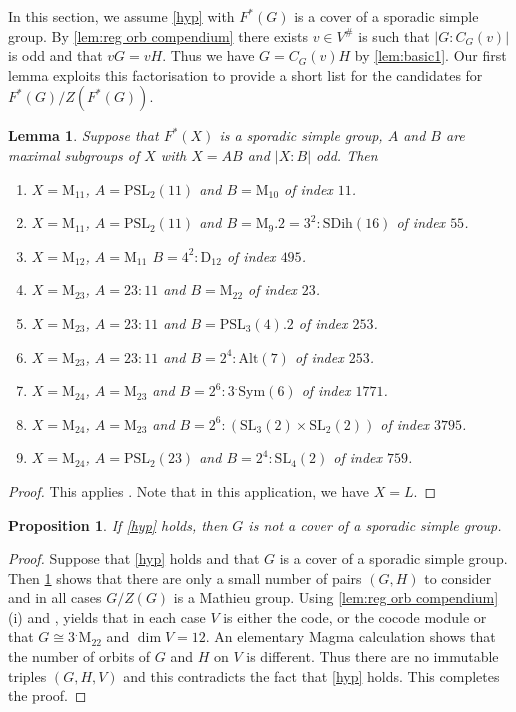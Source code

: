 \documentclass[12pt]{amsart}
\newtheorem{proposition}[theorem]{Proposition}
\newtheorem{lemma}[theorem]{Lemma}
\theoremstyle{remark}
\theoremstyle{notation}
\theoremstyle{definition}
\newcommand{\M}{\mathrm{M}}
\newcommand{\D}{\mathrm{D}}
\newcommand{\SL}{\mathrm{SL}}
\newcommand{\0}{\emptyset}
\newcommand{\PSL}{\mathrm{PSL}}
\newcommand{\Sym}{\mathrm{Sym}}
\newcommand{\Alt}{\mathrm{Alt}}
\newcommand{\SDih}{\mathrm{SDih}}
\begin{document}
In this section,  we assume  \cref{hyp}   with $F^*(G)$ is a cover of a sporadic simple group.  By \cref{lem:reg orb compendium} there exists  $v \in V^\#$ is such that $|G:C_G(v)|$ is odd and that $vG=vH$. Thus we have $G= C_G(v)H  $ by \cref{lem:basic1}. Our first lemma exploits this factorisation to provide a short list for the candidates for $F^*(G)/Z(F^*(G))$.


\begin{lemma}\label{lem:sporadic1} Suppose that $F^*(X)$ is  a sporadic simple group, $A$ and $B$ are maximal subgroups of $X$ with $X= AB$ and   $|X{:}B|$ odd. Then
\begin{enumerate}
\item $X=\M_{11}$, $A=\PSL_2(11)$ and $B= \M_{10}$ of index $11$.
\item $X=\M_{11}$, $A=\PSL_2(11)$ and $B= \M_{9}.2=3^2{:}\SDih(16)$ of index $55$.
\item $X=\M_{12}$, $A= \M_{11}$  $B= 4^2{:}\D_{12}$ of index $495$.
\item $X=\M_{23}$, $A= 23{:}11$ and $B= \M_{22}$ of index $23$.
  \item $X=\M_{23}$, $A= 23{:}11$ and $B= \PSL_3(4).2$ of index $253$.
  \item $X=\M_{23}$, $A= 23{:}11$ and $B= 2^4{:}\Alt(7)$ of index $253$.
\item $X=\M_{24}$, $A= \M_{23}$ and $B= 2^6{:}3^. \Sym(6)$ of index $1771$.
\item $X=\M_{24}$, $A= \M_{23}$ and $B= 2^6{:}(\SL_3(2)\times \SL_2(2))$ of index $3795$.
\item $X=\M_{24}$, $A=\PSL_2(23)$ and $B= 2^4{:}\SL_4(2)$ of index $759$.
\end{enumerate}
\end{lemma}

\begin{proof}
This applies \cite[Theorem C, Table 6]{LiebeckPraegerSaxl}. Note that in this application, we have $X= L$.
\end{proof}
 
\begin{proposition}\label{cor:no sporadics} If \cref{hyp} holds, then $G$ is not a cover of a sporadic simple group.
\end{proposition}

\begin{proof} Suppose that \cref{hyp}  holds and that $G$ is a cover of a sporadic simple group.
Then
  \cref{lem:sporadic1} shows that there are only a small number of pairs $(G,H)$ to consider and in all cases  $G/Z(G)$ is a Mathieu group.  Using \cref{lem:reg orb compendium}(i) and \cite[Theorem 1, Table 1]{FMJO}, yields that in each case $V$ is either the code, or the cocode module or that $G \cong 3^.\M_{22}$ and $\dim V=12$.
  An elementary {\sc Magma} calculation shows that the number of orbits of $G$ and $H$ on $V$ is different. Thus there are no immutable triples $(G,H,V)$ and this contradicts the fact that \cref{hyp} holds.  This completes the proof.
\end{proof}
\end{document}
